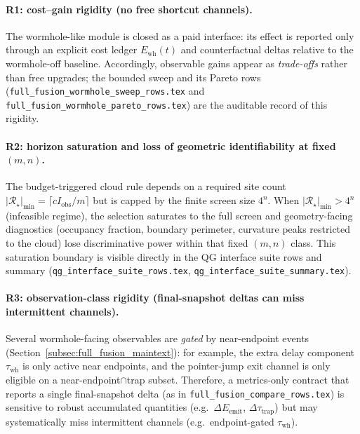 \paragraph{R1: cost--gain rigidity (no free shortcut channels).}
\AuditTag The wormhole-like module is closed as a paid interface: its effect is reported only through an explicit cost ledger $E_{\mathrm{wh}}(t)$ and counterfactual deltas relative to the wormhole-off baseline.
Accordingly, observable gains appear as \emph{trade-offs} rather than free upgrades; the bounded sweep and its Pareto rows (\texttt{full\_fusion\_wormhole\_sweep\_rows.tex} and \texttt{full\_fusion\_wormhole\_pareto\_rows.tex}) are the auditable record of this rigidity.

\paragraph{R2: horizon saturation and loss of geometric identifiability at fixed \texorpdfstring{$(m,n)$}{(m,n)}.}
\AuditTag The budget-triggered cloud rule depends on a required site count $|{\mathcal R}_\star|_{\min}=\lceil cI_{\mathrm{obs}}/m\rceil$ but is capped by the finite screen size $4^n$.
When $|{\mathcal R}_\star|_{\min}>4^n$ (infeasible regime), the selection saturates to the full screen and geometry-facing diagnostics (occupancy fraction, boundary perimeter, curvature peaks restricted to the cloud) lose discriminative power within that fixed $(m,n)$ class.
This saturation boundary is visible directly in the QG interface suite rows and summary (\texttt{qg\_interface\_suite\_rows.tex}, \texttt{qg\_interface\_suite\_summary.tex}).

\paragraph{R3: observation-class rigidity (final-snapshot deltas can miss intermittent channels).}
\AuditTag Several wormhole-facing observables are \emph{gated} by near-endpoint events (Section~\ref{subsec:full_fusion_maintext}): for example, the extra delay component $\tau_{\mathrm{wh}}$ is only active near endpoints, and the pointer-jump exit channel is only eligible on a near-endpoint$\cap$trap subset.
Therefore, a metrics-only contract that reports a single final-snapshot delta (as in \texttt{full\_fusion\_compare\_rows.tex}) is sensitive to robust accumulated quantities (e.g.\ $\Delta E_{\mathrm{emit}}$, $\Delta\tau_{\mathrm{trap}}$) but may systematically miss intermittent channels (e.g.\ endpoint-gated $\tau_{\mathrm{wh}}$).

